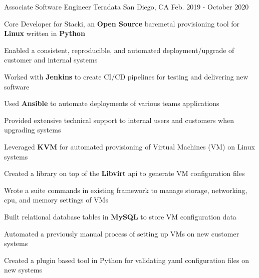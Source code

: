 

\begin{cventries}

  \cventry
    {Associate Software Engineer} %
    {\color{teradataorange}Teradata} %
    {San Diego, CA} %
    {Feb. 2019 - October 2020} %
    {
      \begin{cvitems} %
        \item{ Core Developer for Stacki, an \textbf{Open Source} baremetal provisioning tool for \textbf{Linux} written in \textbf{Python} }
        \item{ Enabled a consistent, reproducible, and automated deployment/upgrade of customer and internal systems }
        \item{ Worked with \textbf{Jenkins} to create CI/CD pipelines for testing and delivering new software }
        \item{ Used \textbf{Ansible} to automate deployments of various teams applications }
        \item{ Provided extensive technical support to internal users and customers when upgrading systems } 
        \item{ Leveraged \textbf{KVM} for automated provisioning of Virtual Machines (VM) on Linux systems }
        \item{ Created a library on top of the \textbf{Libvirt} api to generate VM configuration files }
        \item{ Wrote a suite commands in existing framework to manage storage, networking, cpu, and memory settings of VMs }
        \item{ Built relational database tables in \textbf{MySQL} to store VM configuration data}
        \item{ Automated a previously manual process of setting up VMs on new customer systems }
        \item{ Created a plugin based tool in Python for validating yaml configuration files on new systems }
      \end{cvitems}
    }


\end{cventries}
